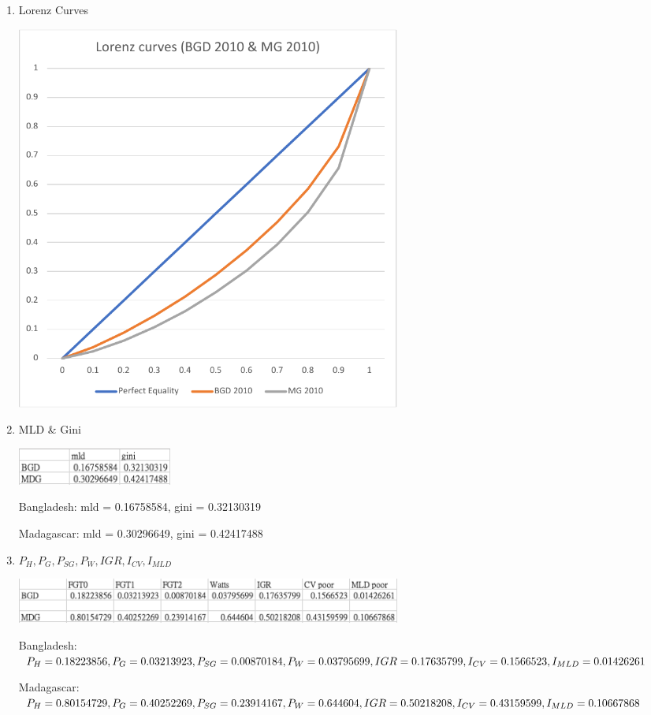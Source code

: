 \documentclass{article}[13pt]
\begin{document}
\begin{enumerate}
    \item{Lorenz Curves}
    
    \includegraphics[width=5in]{lorenzcurve_bgd&mg.pdf}

    \item{MLD \& Gini}
    
    \includegraphics[width=2in]{bdg_mdg_2.png}

    Bangladesh: mld = 0.16758584, gini = 0.32130319

    Madagascar: mld = 0.30296649, gini = 0.42417488

    \item{$P_H, P_G, P_{SG}, P_W, IGR, I_{CV}, I_{MLD}$}
    
    \includegraphics[width=5in]{bdg_mdg_1.png}

    Bangladesh: \newline$P_H = 0.18223856, P_G = 0.03213923, P_{SG} = 0.00870184, P_W = 0.03795699, \newline IGR = 0.17635799, I_{CV} = 0.1566523, I_{MLD} = 0.01426261$

    Madagascar: \newline$P_H = 0.80154729, P_G = 0.40252269, P_{SG} = 0.23914167, P_W = 0.644604, \newline IGR = 0.50218208, I_{CV} = 0.43159599, I_{MLD} = 0.10667868$
    
\end{enumerate}
\end{document}
